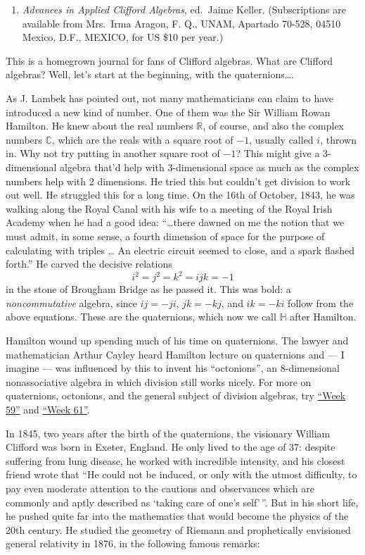 \documentclass{article}
\def\tightlist{}
\begin{document}
\begin{enumerate}
\def\labelenumi{\arabic{enumi})}
\tightlist
\item
  \emph{Advances in Applied Clifford Algebras}, ed.~Jaime Keller.
  (Subscriptions are available from Mrs.~Irma Aragon, F. Q., UNAM,
  Apartado 70-528, 04510 Mexico, D.F., MEXICO, for US \$10 per year.)
\end{enumerate}

This is a homegrown journal for fans of Clifford algebras. What are
Clifford algebras? Well, let's start at the beginning, with the
quaternions\ldots.

As J. Lambek has pointed out, not many mathematicians can claim to have
introduced a new kind of number. One of them was the Sir William Rowan
Hamilton. He knew about the real numbers \(\mathbb{R}\), of course, and
also the complex numbers \(\mathbb{C}\), which are the reals with a
square root of \(-1\), usually called \(i\), thrown in. Why not try
putting in another square root of \(-1\)? This might give a
\(3\)-dimensional algebra that'd help with \(3\)-dimensional space as
much as the complex numbers help with 2 dimensions. He tried this but
couldn't get division to work out well. He struggled this for a long
time. On the 16th of October, 1843, he was walking along the Royal Canal
with his wife to a meeting of the Royal Irish Academy when he had a good
idea: ``\ldots there dawned on me the notion that we must admit, in some
sense, a fourth dimension of space for the purpose of calculating with
triples \ldots{} An electric circuit seemed to close, and a spark
flashed forth.'' He carved the decisive relations
\[i^2 = j^2 = k^2 = ijk = -1\] in the stone of Brougham Bridge as he
passed it. This was bold: a \emph{noncommutative} algebra, since
\(ij = -ji\), \(jk = -kj\), and \(ik = -ki\) follow from the above
equations. These are the quaternions, which now we call \(\mathbb{H}\)
after Hamilton.

Hamilton wound up spending much of his time on quaternions. The lawyer
and mathematician Arthur Cayley heard Hamilton lecture on quaternions
and --- I imagine --- was influenced by this to invent his
``octonions'', an 8-dimensional nonassociative algebra in which division
still works nicely. For more on quaternions, octonions, and the general
subject of division algebras, try \protect\hyperlink{week59}{``Week
59''} and \protect\hyperlink{week61}{``Week 61''}.

In 1845, two years after the birth of the quaternions, the visionary
William Clifford was born in Exeter, England. He only lived to the age
of 37: despite suffering from lung disease, he worked with incredible
intensity, and his closest friend wrote that ``He could not be induced,
or only with the utmost difficulty, to pay even moderate attention to
the cautions and observances which are commonly and aptly described as
`taking care of one's self'\,''. But in his short life, he pushed quite
far into the mathematics that would become the physics of the 20th
century. He studied the geometry of Riemann and prophetically envisioned
general relativity in 1876, in the following famous remarks:
\end{document}
